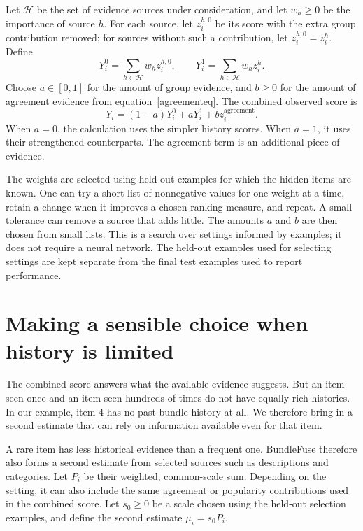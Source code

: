 \documentclass[11pt,a4paper]{article}
\numberwithin{equation}{section}
\begin{document}
Let $\mathcal H$ be the set of evidence sources under consideration, and let $w_h\ge0$
be the importance of source $h$. For each source, let $z_i^{h,0}$ be its score with the
extra group contribution removed; for sources without such a contribution, let
$z_i^{h,0}=z_i^h$. Define
\begin{equation}
 Y_i^0=\sum_{h\in\mathcal H}w_h z_i^{h,0},\qquad
 Y_i^1=\sum_{h\in\mathcal H}w_h z_i^h.
\end{equation}
Choose $a\in[0,1]$ for the amount of group evidence, and $b\ge0$ for the amount of
agreement evidence from equation~\eqref{agreementeq}. The combined observed score is
\begin{equation}\label{observed}
 Y_i=(1-a)Y_i^0+aY_i^1+bz_i^{\mathrm{agreement}}.
\end{equation}
When $a=0$, the calculation uses the simpler history scores. When $a=1$, it uses their
strengthened counterparts. The agreement term is an additional piece of evidence.

The weights are selected using held-out examples for which the hidden items are known.
One can try a short list of nonnegative values for one weight at a time, retain a change
when it improves a chosen ranking measure, and repeat. A small tolerance can remove a
source that adds little. The amounts $a$ and $b$ are then chosen from small lists. This is
a search over settings informed by examples; it does not require a neural network.
The held-out examples used for selecting settings are kept separate from the final test
examples used to report performance.

\section{Making a sensible choice when history is limited}\label{shrink}
The combined score answers what the available evidence suggests. But an item seen once and
an item seen hundreds of times do not have equally rich histories. In our example, item 4
has no past-bundle history at all. We therefore bring in a second estimate that can rely
on information available even for that item.

A rare item has less historical evidence than a frequent one. BundleFuse therefore also
forms a second estimate from selected sources such as descriptions and categories. Let
$P_i$ be their weighted, common-scale sum. Depending on the setting, it can also include
the same agreement or popularity contributions used in the combined score. Let $s_0\ge0$
be a scale chosen using the held-out selection examples, and define the second estimate
$\mu_i=s_0P_i$.
\end{document}
